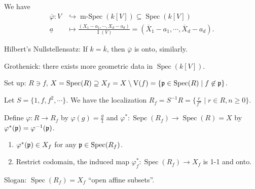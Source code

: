 \begin{remark}
    We have 
    \begin{align*}
        \overbar \varphi: V &\hookrightarrow \operatorname{m-Spec}(k[V]) \subseteq \operatorname{Spec}(k[V]) \\
        \underline a &\mapsto \frac{(X_1-a_1,\cdots,X_d-a_d)}{\operatorname{I}(V)} = (\overbar X_1-a_1,\cdots, \overbar X_d - a_d). 
    \end{align*}
    \par Hilbert's Nullstellensatz: If $k = \overbar k$, then $\overbar \varphi$ is onto, similarly. \par 
    Grothenick: there exists more geometric data in $\operatorname{Spec}(k[V])$. 
\end{remark}

\noindent Set up: $R \ni f$, $X = \operatorname{Spec}(R) \supseteq X_f = X \setminus \operatorname{V}(f) = \{\mathfrak{p} \in \operatorname{Spec}(R) \mid f \not \in \mathfrak{p}\}$.

\begin{recall*}
    Let $S = \{1,f,f^2,\cdots\}$. We have the localization
    $R_f = S^{-1}R = \{\frac{r}{f^n} \mid r \in R, n \geq 0\}$.
\end{recall*}

\begin{proposition}
    Define $\varphi: R \to R_f$ by $\varphi(g) = \frac{g}{1}$ and $\varphi^*: \operatorname{Sepc}(R_f) \to \operatorname{Spec}(R) = X$ by $\varphi^*(\mathfrak{p}) = \varphi^{-1}(\mathfrak{p})$.
    \begin{enumerate}
        \item $\varphi^*(\mathfrak{p}) \in X_f$ for any $\mathfrak{p} \in \operatorname{Spec}(R_f)$. 
        \item Restrict codomain, the induced map $\varphi_f^*: \operatorname{Spec}(R_f) \to X_f$ is 1-1 and onto.
    \end{enumerate}
    Slogan: $\operatorname{Spec}(R_f) = X_f$ ``open affine subsets''.
\end{proposition}

